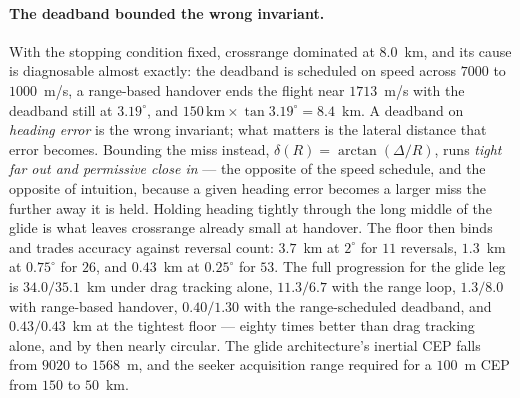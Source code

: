 \documentclass[11pt,a4paper]{article}
\theoremstyle{definition}
\numberwithin{equation}{section}
\begin{document}
\paragraph{The deadband bounded the wrong invariant.} With the stopping condition fixed, crossrange dominated at $8.0$~km, and its cause is diagnosable almost exactly: the deadband is scheduled on speed across $7000$ to $1000$~m/s, a range-based handover ends the flight near $1713$~m/s with the deadband still at $3.19^\circ$, and $150\,\text{km} \times \tan 3.19^\circ = 8.4$~km. A deadband on \emph{heading error} is the wrong invariant; what matters is the lateral distance that error becomes. Bounding the miss instead, $\delta(R) = \arctan(\Delta/R)$, runs \emph{tight far out and permissive close in} --- the opposite of the speed schedule, and the opposite of intuition, because a given heading error becomes a larger miss the further away it is held. Holding heading tightly through the long middle of the glide is what leaves crossrange already small at handover. The floor then binds and trades accuracy against reversal count: $3.7$~km at $2^\circ$ for $11$ reversals, $1.3$~km at $0.75^\circ$ for $26$, and $0.43$~km at $0.25^\circ$ for $53$. The full progression for the glide leg is $34.0/35.1$~km under drag tracking alone, $11.3/6.7$ with the range loop, $1.3/8.0$ with range-based handover, $0.40/1.30$ with the range-scheduled deadband, and $0.43/0.43$~km at the tightest floor --- eighty times better than drag tracking alone, and by then nearly circular. The glide architecture's inertial CEP falls from $9020$ to $1568$~m, and the seeker acquisition range required for a $100$~m CEP from $150$ to $50$~km.
\end{document}
